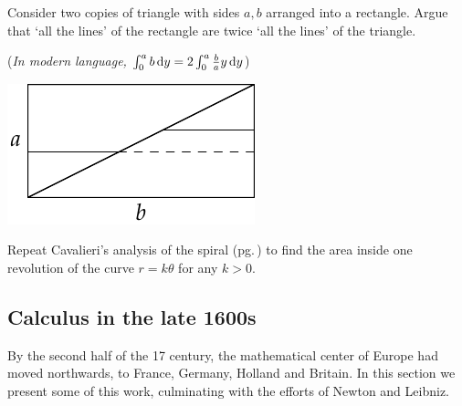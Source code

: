 \begin{exercises}{}{}
\begin{enumerate}
		\begin{minipage}[t]{0.6\linewidth}\vspace{0pt}
			\item Consider two copies of triangle with sides $a,b$ arranged into a rectangle. Argue that `all the lines' of the rectangle are twice `all the lines' of the triangle.\par
			(\emph{In modern language, $\int_0^ab\,{\mathrm{d} y}=2\int_0^a\frac bay\,{\mathrm{d} y}$}) 
		\end{minipage}
		\hfill
		\begin{minipage}[t]{0.39\linewidth}\vspace{0pt}
			\flushright\includegraphics{analytic-torri3}
		\end{minipage}\par
		
		\item Repeat Cavalieri's analysis of the spiral (pg.\,\pageref{pg:cavspiral}) to find the area inside one revolution of the curve $r=k\theta$ for any $k>0$.
		
	\end{enumerate}
\end{exercises}


\clearpage




\subsection{Calculus in the late 1600s}\label{sec:calc2}

By the second half of the 17\th{} century, the mathematical center of Europe had moved northwards, to France, Germany, Holland and Britain. In this section we present some of this work, culminating with the efforts of Newton and Leibniz.\par


